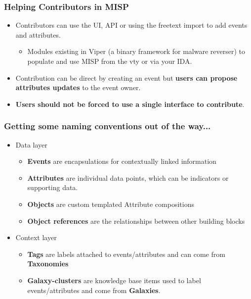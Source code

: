 \begin{frame}
        \frametitle{Helping Contributors in MISP}
        \begin{itemize}
            \item Contributors can use the UI, API or using the freetext import to add events and attributes.
                \begin{itemize}
                        \item Modules existing in Viper (a binary framework for malware reverser) to populate and use MISP from the vty or via your IDA.
                \end{itemize}
        \item Contribution can be direct by creating an event but {\bf users can propose attributes updates} to the event owner.
            \item {\bf Users should not be forced to use a single interface to contribute}.
        \end{itemize}
\end{frame}

\begin{frame}
        \frametitle{Getting some naming conventions out of the way...}
         \begin{itemize}
                \item Data layer
                \begin{itemize}
                    \item {\bf Events} are encapsulations for contextually linked information
                    \item {\bf Attributes} are individual data points, which can be indicators or supporting data.
                    \item {\bf Objects} are custom templated Attribute compositions
                    \item {\bf Object references} are the relationships between other building blocks
                \end{itemize}
                \item Context layer
                \begin{itemize}
                    \item {\bf Tags} are labels attached to events/attributes and can come from {\bf Taxonomies}
                    \item {\bf Galaxy-clusters} are knowledge base items used to label events/attributes and come from {\bf Galaxies}. 
                \end{itemize}
        \end{itemize}
\end{frame}

